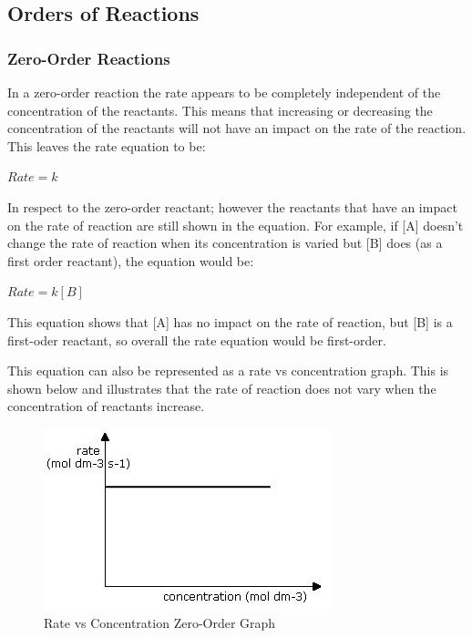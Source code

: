 	\subsection{Orders of Reactions} 

\subsubsection{Zero-Order Reactions}

In a zero-order reaction the rate appears to be completely independent of the concentration of the reactants. This means that increasing or decreasing the concentration of the reactants will not have an impact on the rate of the reaction. This leaves the rate equation to be:

$Rate = k$

In respect to the zero-order reactant; however the reactants that have an impact on the rate of reaction are still shown in the equation. For example, if [A] doesn't change the rate of reaction when its concentration is varied but [B] does (as a first order reactant), the equation would be:

$Rate = k [B]$

This equation shows that [A] has no impact on the rate of reaction, but [B] is a first-oder reactant, so overall the rate equation would be first-order.

This equation can also be represented as a rate vs concentration graph. This is shown below and illustrates that the rate of reaction does not vary when the concentration of reactants increase.

\begin{figure}[H]
    \includegraphics[width=\textwidth]{./Planning/Images/ZeroOrder.jpg}
    \caption{ Rate vs Concentration Zero-Order Graph} \label{fig:Zero Order Graph}
\end{figure}



